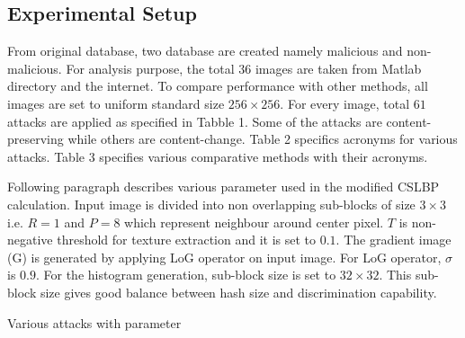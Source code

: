 \documentclass[12pt,a4paper]{jihmsp}
\begin{document}
{{\subsection{Experimental Setup}
From original database, two database are created namely malicious and non-malicious. For analysis purpose, the total $36$ images are taken from Matlab directory and the internet. To compare performance with other methods, all images are set to uniform standard size $256\times256$. For every image, total $61$ attacks are applied as specified in Tabble 1. Some of the attacks are content-preserving while others are content-change. Table 2 specifics acronyms for various attacks. Table 3 specifies various comparative methods with their acronyms.
\par
Following paragraph describes various parameter used in the modified CSLBP calculation. Input image is divided into non overlapping sub-blocks of size $3\times3$ i.e. $R=1$ and $P=8$ which represent neighbour around center pixel. $T$ is non-negative threshold for texture extraction and it is set to $0.1$. The gradient image (G) is generated by applying LoG operator on input image. For LoG operator, $\sigma$ is $0.9$. For the histogram generation, sub-block size is set to $32\times32$. This sub-block size gives good balance between hash size and discrimination capability.

\begin{table} [h]
	\captionsetup[table]{skip=10pt,justification=centering}
	\caption{Various attacks with parameter}
	\centering
	

\end{table}}}
\end{document}
